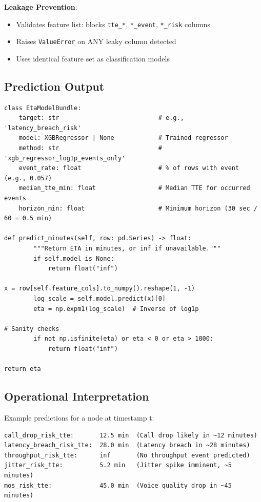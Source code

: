 \documentclass[11pt,a4paper,oneside]{report}
\begin{document}
\textbf{Leakage Prevention}:
\begin{itemize}
    \item Validates feature list: blocks \texttt{tte\_*}, \texttt{*\_event}, \texttt{*\_risk} columns
    \item Raises \texttt{ValueError} on ANY leaky column detected
    \item Uses identical feature set as classification models
\end{itemize}

\subsection{Prediction Output}

\begin{lstlisting}
class EtaModelBundle:
    target: str                           # e.g., 'latency_breach_risk'
    model: XGBRegressor | None            # Trained regressor
    method: str                           # 'xgb_regressor_log1p_events_only'
    event_rate: float                     # % of rows with event (e.g., 0.057)
    median_tte_min: float                 # Median TTE for occurred events
    horizon_min: float                    # Minimum horizon (30 sec / 60 = 0.5 min)

def predict_minutes(self, row: pd.Series) -> float:
        """Return ETA in minutes, or inf if unavailable."""
        if self.model is None:
            return float("inf")

x = row[self.feature_cols].to_numpy().reshape(1, -1)
        log_scale = self.model.predict(x)[0]
        eta = np.expm1(log_scale)  # Inverse of log1p

# Sanity checks
        if not np.isfinite(eta) or eta < 0 or eta > 1000:
            return float("inf")

return eta
\end{lstlisting}

\subsection{Operational Interpretation}

Example predictions for a node at timestamp t:

\begin{verbatim}
call_drop_risk_tte:       12.5 min  (Call drop likely in ~12 minutes)
latency_breach_risk_tte:  28.0 min  (Latency breach in ~28 minutes)
throughput_risk_tte:      inf       (No throughput event predicted)
jitter_risk_tte:          5.2 min   (Jitter spike imminent, ~5 minutes)
mos_risk_tte:             45.0 min  (Voice quality drop in ~45 minutes)
\end{verbatim}
\end{document}
